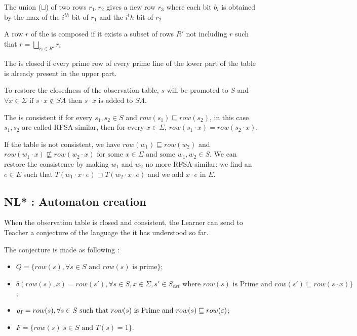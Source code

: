 \begin{definition}
  The union ($\sqcup$) of two rows $r_1, r_2$ gives a new row $r_3$ where each bit $b_i$ is obtained by the max of the $i^{th}$ bit of $r_1$ and the $i^th$ bit of $r_2$
\end{definition}

\begin{definition}
  A row $r$ of the \OT is composed if it exists a subset of rows $R'$ not including $r$ such that $r = \bigsqcup_{r_i \in R'}r_i$
\end{definition}

\begin{definition}[Closedness]
  The \OT is closed if every prime row of every prime line of the lower part of the table is already present in the upper part.
\end{definition}

To restore the closedness of the observation table, $s$ will be promoted to $S$ and $\forall x \in \Sigma \text{ if } s \cdot x \notin SA \text{ then } s \cdot x \text{ is added to } SA$.

\begin{definition}[Consistence]
  The \OT is consistent if for every $s_1,s_2 \in S$ and $row(s_1) \sqsubseteq row(s_2)$, in this case $s_1,s_2$ are called RFSA-similar, then for every $x \in \Sigma$, $row(s_1 \cdot x) = row(s_2 \cdot x)$.
\end{definition}

If the table is not consistent, we have $row(w_1) \sqsubseteq row(w_2)$ and $row(w_1 \cdot x) \not\sqsubseteq row(w_2 \cdot x) \text{ for some } x \in \Sigma \text{ and some }w_1, w_2 \in S$. We can restore the consistence by making $w_1$ and $w_2$ no more RFSA-similar: we find an $e \in E$ such that $T(w_1 \cdot x \cdot e) \sqsupset T(w_2 \cdot x \cdot e)$ and we add $x \cdot e$ in $E$.

\subsection{NL* : Automaton creation}

When the observation table is closed and consistent, the Learner can send to Teacher a conjecture of the language the it has understood so far.

The conjecture is made as following :
\begin{itemize}
  \item $Q = \{row(s), \forall s \in S \text{ and } row(s) \text{ is  prime} \}$;
  \item $\delta(row(s), x) = row(s'), \forall s \in S, x \in \Sigma, s' \in S_{ext} \text{ where } row(s) \text{ is Prime and } row(s') \sqsubseteq row(s \cdot x)\}$;
  \item $q_I = row(s), \forall s \in S \text{ such that } row(s) \text{ is Prime and } row(s) \sqsubseteq row(\varepsilon) $;
  \item $F = \{row(s) | s \in S \text{ and } T(s) = 1 \}$.
\end{itemize}

